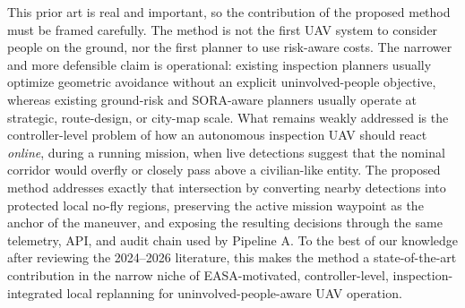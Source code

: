 \documentclass[a4paper,11pt]{article}
\begin{document}
This prior art is real and important, so the contribution of the proposed method must be framed carefully. The method is not the first UAV system to consider people on the ground, nor the first planner to use risk-aware costs. The narrower and more defensible claim is operational: existing inspection planners usually optimize geometric avoidance without an explicit uninvolved-people objective, whereas existing ground-risk and SORA-aware planners usually operate at strategic, route-design, or city-map scale. What remains weakly addressed is the controller-level problem of how an autonomous inspection UAV should react \emph{online}, during a running mission, when live detections suggest that the nominal corridor would overfly or closely pass above a civilian-like entity. The proposed method addresses exactly that intersection by converting nearby detections into protected local no-fly regions, preserving the active mission waypoint as the anchor of the maneuver, and exposing the resulting decisions through the same telemetry, API, and audit chain used by Pipeline A. To the best of our knowledge after reviewing the 2024--2026 literature, this makes the method a state-of-the-art contribution in the narrow niche of EASA-motivated, controller-level, inspection-integrated local replanning for uninvolved-people-aware UAV operation.
\end{document}
